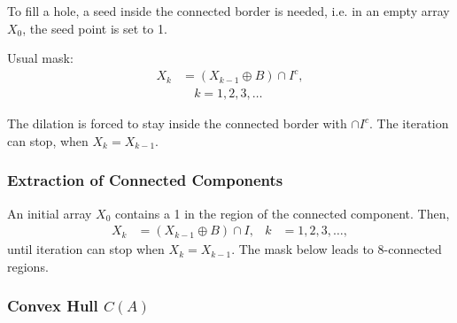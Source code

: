 To fill a hole, a seed inside the connected border is needed, i.e. in an empty array $X_0$, the seed point is set to 1.
\begin{multicols}{2}
	\noindent
	Usual mask:
	\columnbreak
	\begin{align*}
		X_k &= (X_{k-1}\oplus B)\cap I^c, \\ &\quad k = 1,2,3,\ldots
	\end{align*}
\end{multicols}
The dilation is forced to stay inside the connected border with $\cap I^c$.
The iteration can stop, when $X_k = X_{k-1}$.

\subsubsection{Extraction of Connected Components}

An initial array $X_0$ contains a 1 in the region of the connected component. Then,
\begin{align*}
	X_k &= (X_{k-1} \oplus B)\cap I, & k&=1,2,3,\ldots,
\end{align*}
until iteration can stop when $X_k = X_{k-1}$.
The mask below leads to 8-connected regions.
\begin{center}
\end{center}

\subsubsection{Convex Hull $C(A)$}


